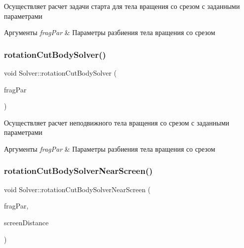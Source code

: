 Осуществляет расчет задачи старта для тела вращения со срезом с заданными параметрами 
\begin{DoxyParams}{Аргументы}
{\em frag\+Par} & Параметры разбиения тела вращения со срезом \\
\hline
\end{DoxyParams}
\mbox{\label{class_solver_a76f649c12fed87fcd5a04be0f6c090df}} 
\subsubsection{\texorpdfstring{rotation\+Cut\+Body\+Solver()}{rotationCutBodySolver()}}
{\footnotesize\ttfamily void Solver\+::rotation\+Cut\+Body\+Solver (\begin{DoxyParamCaption}\item[{const \mbox{\hyperlink{struct_fragmentation_parameters}{Fragmentation\+Parameters}} \&}]{frag\+Par }\end{DoxyParamCaption})}

Осуществляет расчет неподвижного тела вращения со срезом с заданными параметрами 
\begin{DoxyParams}{Аргументы}
{\em frag\+Par} & Параметры разбиения тела вращения со срезом \\
\hline
\end{DoxyParams}
\mbox{\label{class_solver_a6f0cf72490a4ccba78dd13c49c3c1b85}} 
\subsubsection{\texorpdfstring{rotation\+Cut\+Body\+Solver\+Near\+Screen()}{rotationCutBodySolverNearScreen()}}
{\footnotesize\ttfamily void Solver\+::rotation\+Cut\+Body\+Solver\+Near\+Screen (\begin{DoxyParamCaption}\item[{const \mbox{\hyperlink{struct_fragmentation_parameters}{Fragmentation\+Parameters}} \&}]{frag\+Par,  }\item[{const double}]{screen\+Distance }\end{DoxyParamCaption})}

